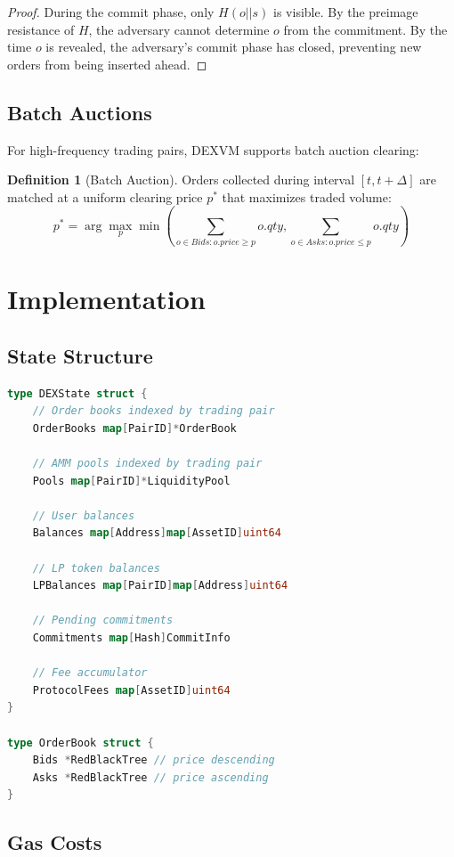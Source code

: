 \documentclass[11pt,a4paper]{article}
\theoremstyle{definition}
\newtheorem{definition}{Definition}
\begin{document}
\begin{proof}
During the commit phase, only $H(o || s)$ is visible. By the preimage resistance of $H$, the adversary cannot determine $o$ from the commitment. By the time $o$ is revealed, the adversary's commit phase has closed, preventing new orders from being inserted ahead.
\end{proof}

\subsection{Batch Auctions}

For high-frequency trading pairs, DEXVM supports batch auction clearing:

\begin{definition}[Batch Auction]
Orders collected during interval $[t, t + \Delta]$ are matched at a uniform clearing price $p^*$ that maximizes traded volume:
\[
p^* = \arg\max_p \min\left(\sum_{o \in Bids: o.price \geq p} o.qty, \sum_{o \in Asks: o.price \leq p} o.qty\right)
\]
\end{definition}

\section{Implementation}

\subsection{State Structure}

\begin{lstlisting}[language=Go]
type DEXState struct {
    // Order books indexed by trading pair
    OrderBooks map[PairID]*OrderBook

    // AMM pools indexed by trading pair
    Pools map[PairID]*LiquidityPool

    // User balances
    Balances map[Address]map[AssetID]uint64

    // LP token balances
    LPBalances map[PairID]map[Address]uint64

    // Pending commitments
    Commitments map[Hash]CommitInfo

    // Fee accumulator
    ProtocolFees map[AssetID]uint64
}

type OrderBook struct {
    Bids *RedBlackTree // price descending
    Asks *RedBlackTree // price ascending
}
\end{lstlisting}

\subsection{Gas Costs}
\end{document}
